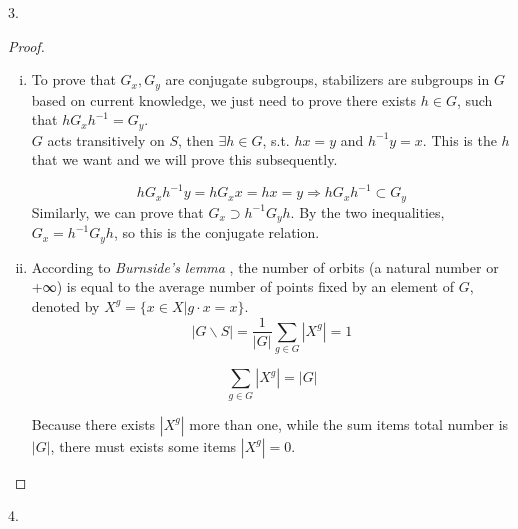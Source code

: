 \begin{exercise}
    3.
\end{exercise}

\begin{proof}
    \begin{enumerate}[(i)]
        \item To prove that $G_x, G_y$ are conjugate subgroups, stabilizers are subgroups in $G$ based on current knowledge, we just need to prove there exists $h\in G$, such that $hG_xh^{-1}=G_y$.\\
        $G$ acts transitively on $S$, then $\exists h\in G$, s.t. $hx=y$ and $h^{-1}y=x$. This is the $h$ that we want and we will prove this subsequently.

        $$hG_xh^{-1}y=hG_x x=hx=y \Rightarrow hG_xh^{-1}\subset G_y $$
        Similarly, we can prove that $G_x \supset h^{-1}G_y h$. By the two inequalities,  $G_x = h^{-1}G_y h$, so this is the conjugate relation.
        \item According to \textit{Burnside's lemma} , the number of orbits (a natural number or +∞) is equal to the average number of points fixed by an element of $G$, denoted by $X^{g}=\{x \in X | g \cdot x=x\}$.
        $$
        |G \backslash S|=\frac{1}{|G|} \sum_{g \in G}\left|X^{g}\right|=1
        $$

        $$
        \sum_{g \in G}\left|X^{g}\right|=|G|
        $$

        Because there exists $|X^g|$ more than one, while the sum items total number is $|G|$, there must exists some items $|X^g|=0$.


    \end{enumerate}
\end{proof}

\begin{exercise}
    4.
\end{exercise}

